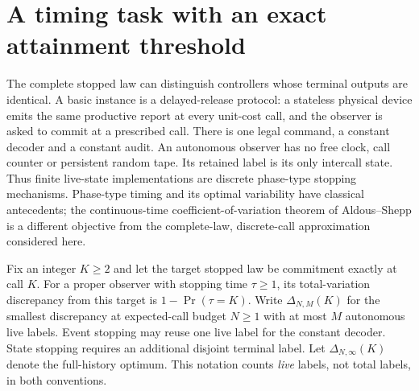 \section{A timing task with an exact attainment threshold}\label{sec:timing-memory}
The complete stopped law can distinguish controllers whose terminal outputs are identical. A basic instance is a delayed-release protocol: a stateless physical device emits the same productive report at every unit-cost call, and the observer is asked to commit at a prescribed call. There is one legal command, a constant decoder and a constant audit. An autonomous observer has no free clock, call counter or persistent random tape. Its retained label is its only intercall state. Thus finite live-state implementations are discrete phase-type stopping mechanisms. Phase-type timing and its optimal variability have classical antecedents; the continuous-time coefficient-of-variation theorem of Aldous--Shepp \cite{AldousShepp87} is a different objective from the complete-law, discrete-call approximation considered here.

Fix an integer $K\ge2$ and let the target stopped law be commitment exactly at call $K$. For a proper observer with stopping time $\tau\ge1$, its total-variation discrepancy from this target is $1-\Pr(\tau=K)$. Write $\Delta_{N,M}(K)$ for the smallest discrepancy at expected-call budget $N\ge1$ with at most $M$ autonomous live labels. Event stopping may reuse one live label for the constant decoder. State stopping requires an additional disjoint terminal label. Let $\Delta_{N,\infty}(K)$ denote the full-history optimum. This notation counts \emph{live} labels, not total labels, in both conventions.

